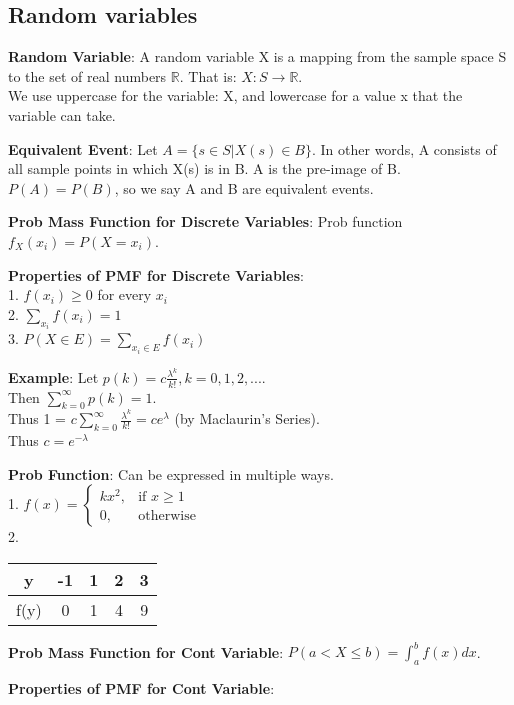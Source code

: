 \documentclass[a4paper,landscape]{article}
\newcommand{\rntopic}[1]{\vspace{-2.0em}\subsection*{#1}\vspace{-1.0em}}
\newcommand{\rnname}[1]{\textbf{#1}}
\newcommand{\reals}{\mathbb{R}}
\begin{document}
\begin{multicols*}{4}
\begin{flatitemize}
\end{flatitemize}
\vspace{0.3cm}
\rntopic{Random variables}
\begin{flatitemize}
\vspace{0.3cm}
\item \rnname{Random Variable}: A random variable X is a mapping from the sample space S to the set of real numbers $\reals$. That is: $X : S \rightarrow \reals$. \\
We use uppercase for the variable: X, and lowercase for a value x that the variable can take.
\item \rnname{Equivalent Event}: Let $A = \{s \in S | X(s) \in B\}$. In other words, A consists of all sample points in which X(s) is in B. A is the pre-image of B. $P(A) = P(B)$, so we say A and B are equivalent events.
\item \rnname{Prob Mass Function for Discrete Variables}: Prob function $f_X (x_i) = P(X = x_i)$.
\item \rnname{Properties of PMF for Discrete Variables}: \\
1. $f(x_i) \geq 0$ for every $x_i$ \\
2. $\sum_{x_i} f(x_i) = 1$ \\
3. $P(X \in E) = \sum_{x_i \in E} f(x_i)$
\item \rnname{Example}: Let $p(k) = c\frac{\lambda^{k}}{k!}, k = 0,1,2,...$. \\
Then $\sum_{k=0}^{\infty}p(k) = 1$. \\
Thus 1 = $c\sum_{k=0}^{\infty}\frac{\lambda ^ {k}}{k!} = c e^\lambda$ (by Maclaurin's Series). \\
Thus $c = e^{-\lambda}$
\item \rnname{Prob Function}: Can be expressed in multiple ways. \\
1. $f(x) = 
\begin{cases}
    kx^2,& \text{if } x\geq 1\\
    0,              & \text{otherwise}
\end{cases}$ \\
2.
\begin{tabular}{ | c | c | c | c | c | } \hline
 y & -1 & 1 & 2 & 3 \\ \hline
f(y) & 0 & 1 & 4 & 9\\ \hline
\end{tabular}
\item \rnname{Prob Mass Function for Cont Variable}: $P(a < X \leq b) = \int_a^b f(x) dx$.
\item \rnname{Properties of PMF for Cont Variable}: \\

\end{flatitemize}
\end{multicols*}
\end{document}
